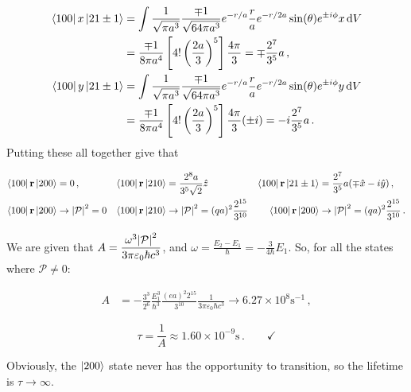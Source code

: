 \documentclass[10pt]{article}
\begin{document}
\begin{align*}
    \bra{1 0 0} x \ket{2 1 \pm 1} 
        & = \int \frac{1}{\sqrt{\pi a^3}}\frac{\mp 1}{\sqrt{64\pi a^3}}e^{-r/a}\frac{r}{a}e^{-r/2a}\sin(\theta)e^{\pm i \phi} x\dd{V}\\
        & = \frac{\mp 1}{8\pi a^4}\left[4!\left(\frac{2a}{3}\right)^5\right]\frac{4\pi}{3} = \mp \frac{2^7}{3^5}a \, ,\\
    \bra{1 0 0} y \ket{2 1 \pm 1} 
        & = \int \frac{1}{\sqrt{\pi a^3}}\frac{\mp 1}{\sqrt{64\pi a^3}}e^{-r/a}\frac{r}{a}e^{-r/2a}\sin(\theta)e^{\pm i \phi} y\dd{V}\\
        & = \frac{\mp 1}{8\pi a^4}\left[4!\left(\frac{2a}{3}\right)^5\right]\frac{4\pi}{3}(\pm i) = -i \frac{2^7}{3^5}a \, .
\end{align*}
Putting these all together give that 

\begin{align*}
    \bra{1 0 0}\vb{r}\ket{2 0 0} & = 0 \, , 
        & \bra{1 0 0}\vb{r}\ket{2 1 0} & =\frac{2^8 a}{3^5 \sqrt{2}}\hat{z} 
        & \bra{1 0 0}\vb{r}\ket{2 1 \pm 1} & = \frac{2^7}{3^5}a(\mp \hat{x} - i \hat{y}) \, , \\
    \bra{1 0 0}\vb{r}\ket{2 0 0} & \rightarrow \abs{\mathcal{P}}^2 = 0 
        & \bra{1 0 0}\vb{r}\ket{2 1 0} & \rightarrow \abs{\mathcal{P}}^2 = (qa)^2\frac{2^{15}}{3^{10}}  
        & \bra{1 0 0}\vb{r}\ket{2 0 0} & \rightarrow \abs{\mathcal{P}}^2 = (qa)^2\frac{2^{15}}{3^{10}} \, .
\end{align*}

We are given that 
$\displaystyle{A = \frac{\omega^3 \abs{\mathcal{P}}^2}{3\pi \varepsilon_0 \hbar c^3}}$, 
and 
$\displaystyle{\omega = \frac{E_2-E_1}{\hbar} = -\frac{3}{4\hbar}E_1}$. 
So, for all the states where $\mathcal{P}\neq 0$:

\begin{align*}
    A & = -\frac{3^3}{2^6}\frac{E_1^3}{\hbar^3}\frac{(ea)^2 2^{15}}{3^{10}}\frac{1}{3\pi\varepsilon_0 \hbar c^3} \rightarrow 6.27\times 10^8 \text{s}^{-1} \, ,
\end{align*}

\[\boxed{\tau = \frac{1}{A} \approx 1.60\times 10^{-9} \text{s}} \, .\qquad \checkmark\]

Obviously, the $\ket{2 0 0 }$ state never has the opportunity to transition, so the lifetime is $\tau \rightarrow \infty$. 
\end{document}
